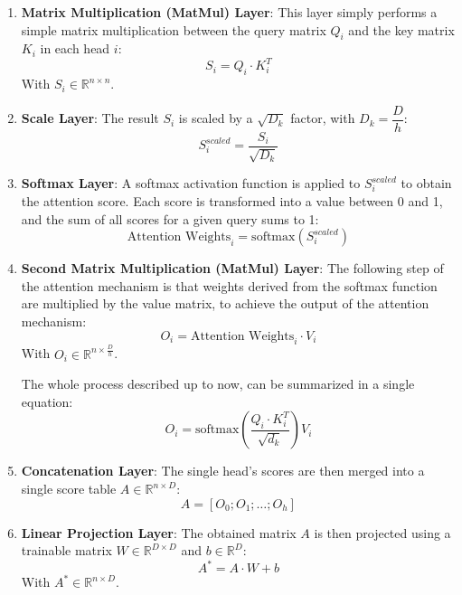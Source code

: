 \documentclass[12pt]{article}
\begin{document}
\begin{enumerate}
    \item \textbf{Matrix Multiplication (MatMul) Layer}: This layer simply performs
    a simple matrix multiplication between the query matrix $Q_i$ and the key matrix $K_i$ in each head $i$:
    \begin{equation}
        S_i = Q_i \cdot K_i^T
    \end{equation}
    With $S_i \in \mathbb{R}^{n \times n}$.

    \item \textbf{Scale Layer}: The result $S_i$ is scaled by a $\sqrt{D_k}$ factor, with $D_k = \dfrac{D}{h}$:
    \begin{equation}
        S_i^{scaled} = \dfrac{S_i}{\sqrt{D_k}}
    \end{equation}

    \item \textbf{Softmax Layer}: A softmax activation function is applied to $S_i^{scaled}$ to obtain the 
    attention score. Each score is transformed into a value between 0 and 1, and the sum of all scores for a 
    given query sums to 1:
    \begin{equation}
        \text{Attention Weights}_i = \text{softmax} (S_i^{scaled})
    \end{equation}

    \item \textbf{Second Matrix Multiplication (MatMul) Layer}: The following step of the attention mechanism 
    is that weights derived from the softmax function are multiplied by the value matrix, to achieve the output 
    of the attention mechanism:
    \begin{equation}
        O_i = \text{Attention Weights}_i \cdot V_i
    \end{equation}
    With $O_i \in \mathbb{R}^{n \times \frac{D}{h}}$. 
    
    The whole process described up to now, can be summarized in a single equation:
    \begin{equation}
        \label{eq:transformer_self_attention_score}
        O_i = \text{softmax} \left( \dfrac{Q_i \cdot K_i^T}{\sqrt{d_k}} \right) V_i
    \end{equation}

    \item \textbf{Concatenation Layer}: The single head's scores are then merged into a single score table 
    $A \in \mathbb{R}^{n \times D}$:
    \begin{equation}
        A = [O_0; O_1; \dots; O_h]
    \end{equation}

    \item \textbf{Linear Projection Layer}: The obtained matrix $A$ is then projected using a trainable matrix 
    $W \in \mathbb{R}^{D \times D}$ and $b \in \mathbb{R}^D$:
    \begin{equation}
        A^* = A \cdot W + b
    \end{equation}
    With $A^* \in \mathbb{R}^{n \times D}$.
\end{enumerate}
\end{document}
